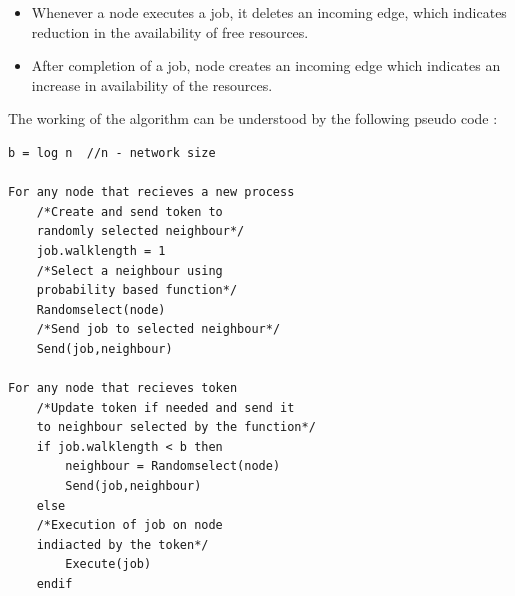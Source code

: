 \begin{itemize}
\item Whenever a node executes a job, it deletes an incoming edge, which indicates reduction
in the availability of free resources.
\item After completion of a job, node creates an incoming edge which indicates an increase
in availability of the resources.
\end{itemize} 
The working of the algorithm can be understood by the following pseudo code :

\begin{verbatim}
b = log n  //n - network size

For any node that recieves a new process 
    /*Create and send token to 
    randomly selected neighbour*/
    job.walklength = 1
    /*Select a neighbour using 
    probability based function*/
    Randomselect(node)
    /*Send job to selected neighbour*/
    Send(job,neighbour)

For any node that recieves token
    /*Update token if needed and send it 
    to neighbour selected by the function*/
    if job.walklength < b then
        neighbour = Randomselect(node)
        Send(job,neighbour)
    else
    /*Execution of job on node 
    indiacted by the token*/
        Execute(job)
    endif
\end{verbatim}


